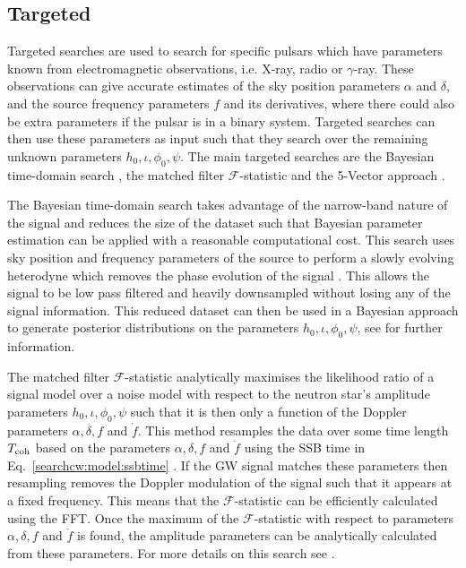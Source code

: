 \subsection{\label{searchcw:search:targeted}Targeted}

Targeted searches are used to search for specific
pulsars which have parameters known from electromagnetic observations, i.e.
X-ray, radio or $\gamma$-ray.  These observations can give accurate estimates of the sky position parameters
$\alpha$ and $\delta$, and the source frequency parameters $f$ and its
derivatives, where there could also be extra parameters if the pulsar is in a
binary system.
Targeted searches can then use these parameters as input such that they search
over the remaining unknown parameters $h_0, \iota, \phi_0, \psi$.  The
main targeted searches are the Bayesian time-domain search
\citep{dupuis2005BayesianEstimation}, the matched filter
$\mathcal{F}$-statistic \citep{schutz1998DataAnalysis} and the 5-Vector
approach \citep{astone2010MethodDetection}.

The Bayesian time-domain search takes advantage of the narrow-band nature of the signal and reduces the size of the dataset such that Bayesian parameter
estimation can be applied with a reasonable computational cost.  This search
uses sky position and frequency parameters of the source to perform a slowly
evolving heterodyne which removes the phase evolution of the signal
\citep{dupuis2005BayesianEstimation}.  This allows
the signal to be low pass filtered and heavily downsampled without losing any
of the signal information.  This reduced dataset can then be used in a Bayesian
approach to generate posterior distributions on the parameters $h_0, \iota, \phi_0, \psi$, see
\citep{dupuis2005BayesianEstimation} for further information.  

The matched filter $\mathcal{F}$-statistic \citep{schutz1998DataAnalysis} analytically maximises the likelihood ratio of a signal model over a noise model with respect to the neutron star's amplitude parameters $h_0, \iota, \phi_0, \psi$ such that it is then only a function of the Doppler parameters $\alpha, \delta, f$ and $\dot{f}$. 
This method resamples the data over some time length $T_{\rm coh}$ based on the parameters $\alpha, \delta, f$ and $\dot{f}$ using the \gls{SSB} time in Eq.~\ref{searchcw:model:ssbtime} \citep{schutz1998DataAnalysis}.
If the \gls{GW} signal matches these parameters then resampling removes the Doppler modulation of the signal such that it appears at a fixed frequency.
This means that the $\mathcal{F}$-statistic can be efficiently calculated using the \gls{FFT}. 
Once the maximum of the $\mathcal{F}$-statistic with respect to parameters $\alpha, \delta, f$ and $\dot{f}$  is found, the amplitude parameters can be analytically calculated from these parameters.
For more details on this search see \citep{schutz1998DataAnalysis,brady2000SearchingPeriodic,prix2007SearchContinuous,
aasi2014GRAVITATIONALWAVES}.

